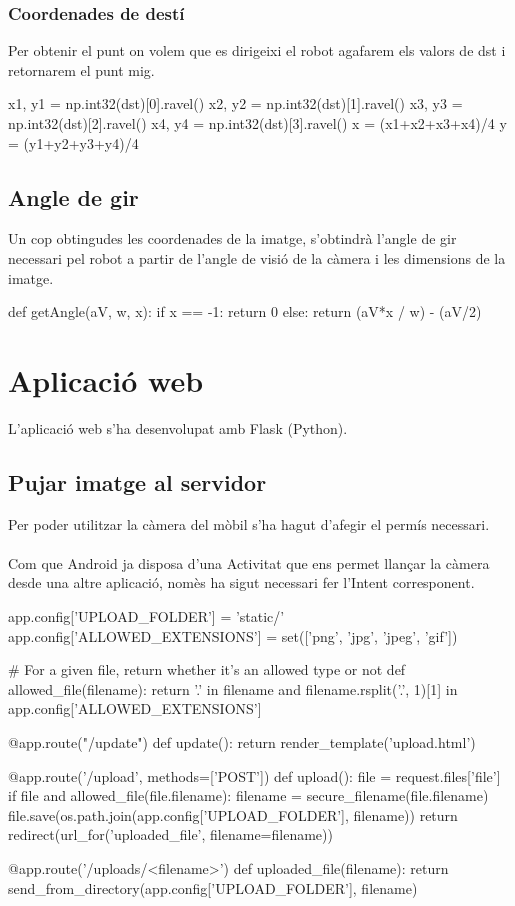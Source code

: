 		\subsubsection{Coordenades de destí}
Per obtenir el punt on volem que es dirigeixi el robot agafarem els valors de dst i retornarem el punt mig.\\
		\begin{python}
		x1, y1 = np.int32(dst)[0].ravel()
		x2, y2 = np.int32(dst)[1].ravel()
		x3, y3 = np.int32(dst)[2].ravel()
		x4, y4 = np.int32(dst)[3].ravel()
		x = (x1+x2+x3+x4)/4
		y = (y1+y2+y3+y4)/4
		\end{python}

	\subsection{Angle de gir}
		Un cop obtingudes les coordenades de la imatge, s'obtindrà l'angle de gir necessari pel robot a partir de l'angle de visió de la càmera i les dimensions de la imatge.\\
		\begin{python}
def getAngle(aV, w, x):
	if x == -1:
		return 0
	else:
		return (aV*x / w) - (aV/2)
		\end{python}

\section{Aplicació web}
	L'aplicació web s'ha desenvolupat amb Flask (Python).
	\subsection{Pujar imatge al servidor}
		Per poder utilitzar la càmera del mòbil s'ha hagut d'afegir el permís necessari.\\\\
		Com que Android ja disposa d'una Activitat que ens permet llançar la càmera desde una altre aplicació, nomès ha sigut necessari fer l'Intent corresponent.\\
		\begin{python}
app.config['UPLOAD_FOLDER'] = 'static/'
app.config['ALLOWED_EXTENSIONS'] = set(['png', 'jpg', 'jpeg', 'gif'])

# For a given file, return whether it's an allowed type or not
def allowed_file(filename):
	return '.' in filename and 
		filename.rsplit('.', 1)[1] in app.config['ALLOWED_EXTENSIONS']

@app.route("/update")
def update():
	return render_template('upload.html')

@app.route('/upload', methods=['POST'])
def upload():
	file = request.files['file']
	if file and allowed_file(file.filename):
		filename = secure_filename(file.filename)
		file.save(os.path.join(app.config['UPLOAD_FOLDER'], filename))
		return redirect(url_for('uploaded_file', filename=filename))

@app.route('/uploads/<filename>')
def uploaded_file(filename):
	return send_from_directory(app.config['UPLOAD_FOLDER'], filename)
		\end{python}

